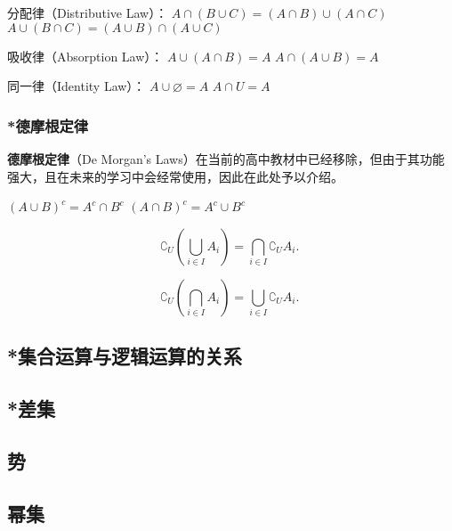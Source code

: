 分配律（Distributive Law）：
$ A \cap (B \cup C) = (A \cap B) \cup (A \cap C) $
$ A \cup (B \cap C) = (A \cup B) \cap (A \cup C) $

吸收律（Absorption Law）：
$ A \cup (A \cap B) = A $
$ A \cap (A \cup B) = A $

同一律（Identity Law）：
$A \cup \varnothing = A$
$ A \cap U = A $
 
\subsubsection{*德摩根定律}

\textbf{德摩根定律}（De Morgan’s Laws）在当前的高中教材中已经移除，但由于其功能强大，且在未来的学习中会经常使用，因此在此处予以介绍。

$ (A \cup B)^c = A^c \cap B^c $
$ (A \cap B)^c = A^c \cup B^c $

\begin{equation}
\complement_U(\bigcup_{i\in I} A_i)=\bigcap_{i\in I} \complement_UA_i.~
\end{equation}

\begin{equation}
\complement_U(\bigcap_{i\in I} A_i)=\bigcup_{i\in I} {\complement_UA_i}.~
\end{equation}


\subsection{*集合运算与逻辑运算的关系}



\subsection{*差集}
\subsection{势}
\subsection{幂集}